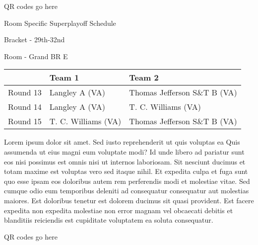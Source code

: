 \documentclass{article}%
\begin{document}
\vspace*{140pt}%
\begin{center}%
\begin{Huge}%
QR codes go here%
\end{Huge}%
\end{center}%
\newpage%
\begin{center}%
\begin{Huge}%
Room Specific Superplayoff Schedule%
\end{Huge}%
\vspace*{8pt}%
\linebreak%
\begin{Large}%
Bracket {-} 29th{-}32nd%
\end{Large}%
\vspace*{8pt}%
\linebreak%
\vspace*{8pt}%
\begin{Large}%
Room {-} Grand BR E%
\end{Large}%
\end{center}%
%
\begin{tabularx}{\textwidth}{|c|Y|Y|}%
\hline%
&Team 1&Team 2\\%
\hline%
Round 13&Langley A (VA)&Thomas Jefferson S\&T B (VA)\\%
Round 14&Langley A (VA)&T. C. Williams (VA)\\%
Round 15&T. C. Williams (VA)&Thomas Jefferson S\&T B (VA)\\%
\hline%
\end{tabularx}%
\vspace*{8pt}%
\newline%
Lorem ipsum dolor sit amet. Sed iusto reprehenderit ut quis voluptas ea Quis assumenda ut eius magni eum voluptate modi? Id unde libero ad pariatur sunt eos nisi possimus est omnis nisi ut internos laboriosam. Sit nesciunt ducimus et totam maxime est voluptas vero sed itaque nihil. Et expedita culpa et fuga sunt quo esse ipsam eos doloribus autem rem perferendis modi et molestiae vitae.\newline%
\newline%
Sed cumque odio eum temporibus deleniti ad consequatur consequatur aut molestias maiores. Est doloribus tenetur est dolorem ducimus sit quasi provident. Est facere expedita non expedita molestiae non error magnam vel obcaecati debitis et blanditiis reiciendis est cupiditate voluptatem ea soluta consequatur.%
\vspace*{140pt}%
\begin{center}%
\begin{Huge}%
QR codes go here%
\end{Huge}%
\end{center}%
\end{document}
